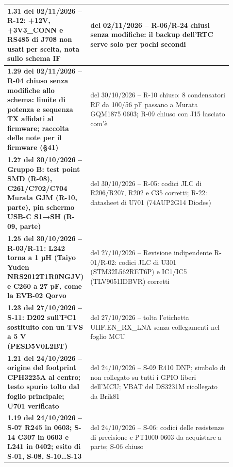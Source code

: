 {\begin{longtable}{>{\raggedright\arraybackslash}p{0.2\linewidth}>{\raggedright\arraybackslash}p{0.72\linewidth}}
\textbf{1.31 del 02/\allowbreak{}11/\allowbreak{}2026 – R-12: +12V, +3V3\_\allowbreak{}CONN e RS485 di J708 non usati per scelta, nota sullo schema IF} & 1.30 del 02/\allowbreak{}11/\allowbreak{}2026 – R-06/\allowbreak{}R-24 chiusi senza modifiche: il backup dell'RTC serve solo per pochi secondi \\
\midrule[0.15pt]

\textbf{1.29 del 02/\allowbreak{}11/\allowbreak{}2026 – R-04 chiuso senza modifiche allo schema: limite di potenza e sequenza TX affidati al firmware; raccolta delle note per il firmware (§41)} & 1.28 del 30/\allowbreak{}10/\allowbreak{}2026 – R-10 chiuso: 8 condensatori RF da 100/\allowbreak{}56 pF passano a Murata GQM1875 0603; R-09 chiuso con J15 lasciato com'è \\
\midrule[0.15pt]

\textbf{1.27 del 30/\allowbreak{}10/\allowbreak{}2026 – Gruppo B: test point SMD (R-08), C261/\allowbreak{}C702/\allowbreak{}C704 Murata GJM (R-10, parte), pin schermo USB-C S1→SH (R-09, parte)} & 1.26 del 30/\allowbreak{}10/\allowbreak{}2026 – R-05: codici JLC di R206/\allowbreak{}R207, R202 e C35 corretti; R-22: datasheet di U701 (74AUP2G14 Diodes) \\
\midrule[0.15pt]

\textbf{1.25 del 30/\allowbreak{}10/\allowbreak{}2026 – R-03/\allowbreak{}R-11: L242 torna a 1 µH (Taiyo Yuden NRS2012T1R0NGJV) e C260 a 27 pF, come la EVB-02 Qorvo} & 1.24 del 27/\allowbreak{}10/\allowbreak{}2026 – Revisione indipendente R-01/\allowbreak{}R-02: codici JLC di U301 (STM32L562RET6P) e IC1/\allowbreak{}IC5 (TLV9051IDBVR) corretti \\
\midrule[0.15pt]

\textbf{1.23 del 27/\allowbreak{}10/\allowbreak{}2026 – S-11: D202 sull'I²C1 sostituito con un TVS a 5 V (PESD5V0L2BT)} & 1.22 del 27/\allowbreak{}10/\allowbreak{}2026 – tolta l'etichetta UHF.EN\_\allowbreak{}RX\_\allowbreak{}LNA senza collegamenti nel foglio MCU \\
\midrule[0.15pt]

\textbf{1.21 del 24/\allowbreak{}10/\allowbreak{}2026 – origine del footprint CPH3225A al centro; testo spurio tolto dal foglio principale; U701 verificato} & 1.20 del 24/\allowbreak{}10/\allowbreak{}2026 – S-09 R410 DNP; simbolo di non collegato su tutti i GPIO liberi dell'MCU; VBAT del DS3231M ricollegato da Brik81 \\
\midrule[0.15pt]

\textbf{1.19 del 24/\allowbreak{}10/\allowbreak{}2026 – S-07 R245 in 0603; S-14 C307 in 0603 e L241 in 0402; esito di S-01, S-08, S-10…S-13} & 1.18 del 24/\allowbreak{}10/\allowbreak{}2026 – S-06: codici delle resistenze di precisione e PT1000 0603 da acquistare a parte; S-06 chiuso \\
\midrule[0.15pt]


\end{longtable}}
